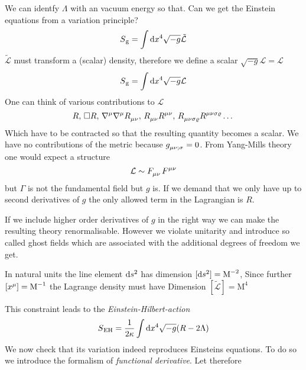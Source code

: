 We can identfy $\Lambda$ with an vacuum energy so that. Can we get the Einstein
equations from a variation principle?
\begin{equation}
S\textsubscript{g}=\int\dif x^4 \sqrt{-g}\tilde{\mathcal{L}}
\end{equation}
$\tilde{\mathcal{L}}$ must transform a (scalar) density, therefore we define a
scalar $\sqrt{-g}\mathcal{L}=\mathcal{L}$
\begin{equation}
S\textsubscript{g}=\int\dif x^4 \sqrt{-g}\mathcal{L}
\end{equation}
One can think of various contributions to $\mathcal{L}$
\begin{equation*}
R,\, \square
R,\,\tensor{\nabla}{^\mu}\tensor{\nabla}{^\mu}\tensor{R}{_\mu_\nu},\,
\tensor{R}{_\mu_\nu}\tensor{R}{^\mu^\nu}
,\,\tensor{R}{_\mu_\nu_\sigma_\varrho}\tensor{R}{^\mu^\nu^\sigma^\varrho}\dots
\end{equation*}
Which have to be contracted so that the resulting quantity becomes a scalar.
We have no contributions of the metric because
$\tensor{g}{_\mu_\nu_{;\sigma}}=0$. From Yang-Mills theory one would expect a
structure
\begin{equation}
\mathcal{L}\sim\tensor{F}{_\mu_\nu}\tensor{F}{^\mu^\nu}
\end{equation}
but $\Gamma$ is not the fundamental field but $g$ is. If we demand that we only
have up to second derivatives of $g$ the only allowed term in the Lagrangian is
$R$.
\begin{sidenote}
If we include higher order derivatives of $g$ in the right way we can make the
resulting theory renormalisable. However we violate unitarity and introduce so
called ghost fields which are associated with the additional degrees of freedom
we get.
\end{sidenote}
\begin{remark}[Dimensions]
In natural units the line element $\dif s^2$ has dimension ${[\dif
s^2]=\textrm{M}^{-2}}$, Since further
${\left[\tensor{x}{^\mu}\right]=\textrm{M}^{-1}}$ the Lagrange density must have Dimension ${\left[\tilde{\mathcal{L}}\right]=\textrm{M}^{4}}$
\end{remark}
This constraint leads to the \emph{Einstein-Hilbert-action}
\begin{equation}
S\textsubscript{EH}=\frac{1}{2\kappa}\int\dif x^4 \sqrt{-g}(R-2\Lambda)
\end{equation}
We now check that its variation indeed reproduces Einsteins equations. To do
so we introduce the formalism of \emph{functional derivative}. Let therefore
